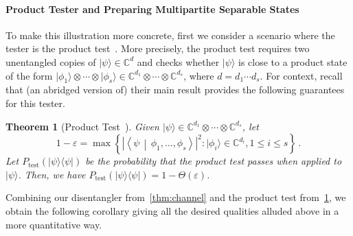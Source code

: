 \documentclass[10pt,a4paper]{article}
\newtheorem{theorem}{Theorem}[section]
\theoremstyle{remark}
\def\epsilon{\varepsilon}
\newcommand{\mper}{\,.}
\newcommand{\C}{{\mathbb C}}
\newcommand{\abs}[1]{\ensuremath{\left\lvert #1 \right\rvert}}
\newcommand{\1}[1]{\mathds{1}{[#1]}}
\newcommand{\ket}[1]{\lvert #1\rangle}
\newcommand{\braket}[2]{\left\langle #1 \,\middle\vert\, #2\right\rangle}
\newcommand{\bra}[1]{\langle#1|}
\numberwithin{equation}{section}
\begin{document}
\paragraph{Product Tester and Preparing Multipartite Separable States}
To make this illustration more concrete, first we consider a  scenario where the tester is the product test~\cite{HM13}. More precisely, the product test requires two unentangled copies of $\ket{\psi} \in \C^d$ and checks whether
$\ket\psi$ is close to a  product state of the form $\ket{\phi_1}\otimes \cdots \otimes \ket{\phi_s} \in \C^{d_1} \otimes \cdots \otimes \C^{d_s}$,
where $d=d_1\cdots d_s$. 
For context, %
recall that (an abridged version of) their main result provides the following guarantees for this tester.

\begin{theorem}[Product Test~\cite{HM13}]\label{theo:prod_test}
  Given $\ket{\psi} \in \C^{d_1} \otimes \cdots \otimes \C^{d_s}$, let
  \[
  1-\epsilon = \max \left\{ \abs{\braket{\psi}{\phi_1,\ldots,\phi_s}}^2 \colon \ket{\phi_i} \in \C^{d_i}, 1 \le i \le s  \right\}\mper
  \]
  Let $P_{\text{test}}(\ket{\psi}\bra{\psi})$ be the probability that the product test passes when applied to $\ket{\psi}$.
  Then, we have $P_{\text{test}}(\ket{\psi}\bra{\psi}) = 1 - \Theta(\epsilon)$.
\end{theorem}

Combining our disentangler from~\cref{thm:channel} and the product test from~\cref{theo:prod_test}, we obtain the
following corollary giving all the desired qualities alluded above in a more quantitative way.
\end{document}
